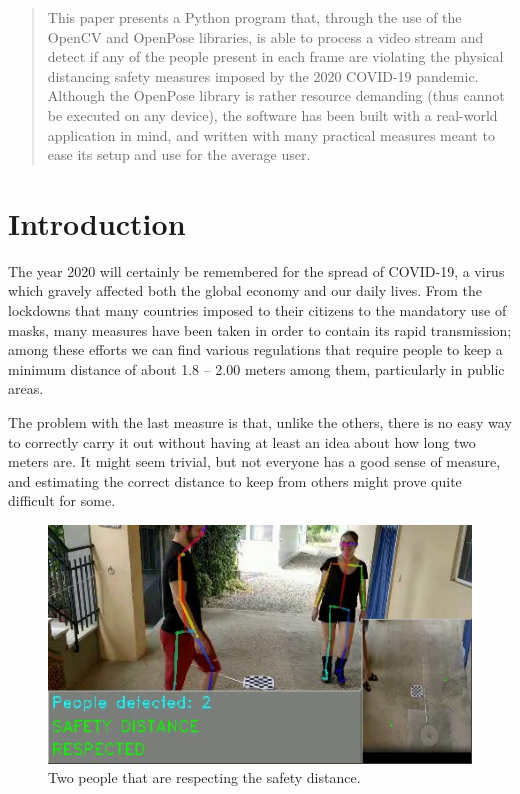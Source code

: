 \documentclass[12pt]{article}
\begin{document}

\tableofcontents
\pagebreak


\begin{abstract}
   This paper presents a Python program that, through the use of the OpenCV\cite{cvpython} and OpenPose\cite{oppython} libraries, is able to process a video stream and detect if any of the people present in each frame are violating the physical distancing safety measures imposed by the 2020 COVID-19 pandemic. Although the OpenPose library is rather resource demanding (thus cannot be executed on any device), the software has been built with a real-world application in mind, and written with many practical measures meant to ease its setup and use for the average user.
\end{abstract}

\section{Introduction}
\label{chap:intro}

The year 2020 will certainly be remembered for the spread of COVID-19, a virus which gravely affected both the global economy and our daily lives. From the lockdowns that many countries imposed to their citizens to the mandatory use of masks, many measures have been taken in order to contain its rapid transmission; among these efforts we can find various regulations that require people to keep a minimum distance of about 1.8 – 2.00 meters among them, particularly in public areas.

The problem with the last measure is that, unlike the others, there is no easy way to correctly carry it out without having at least an idea about how long two meters are. It might seem trivial, but not everyone has a good sense of measure, and estimating the correct distance to keep from others might prove quite difficult for some.

\begin{figure}[H]
\begin{center}
    \includegraphics[width=0.85\linewidth]{img/sample_c2_1.jpg}
\end{center}
   \caption{Two people that are respecting the safety distance.}
\label{fig:c21}
\end{figure}
\end{document}
